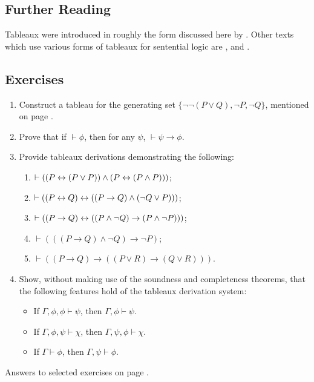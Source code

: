 {\small

\subsection*{Further Reading}

Tableaux were introduced in roughly the form discussed here by \citet{smullyan}. Other texts which use various forms of tableaux for sentential logic are \citealt[ch. 4]{bevpospa}, \citealt{priintncl} and \citealt{smith}.

\subsection*{Exercises} \label{ex6}

\begin{enumerate}
\item Construct a tableau for the generating set $\{¬¬(P\vee Q),¬P,¬Q\}$, mentioned on page \pageref{tabl6ex}.
 \item Prove that if $\vdash \phi$, then for any $\psi$, $\vdash \psi\to\phi$.

	\item Provide  tableaux derivations demonstrating the following: \begin{enumerate}
		\item $\vdash ((P \leftrightarrow (P \vee P)) \wedge (P \leftrightarrow (P \wedge P)))$;
		\item $\vdash ((P\leftrightarrow Q) \leftrightarrow ((P\to Q) \wedge (\neg Q \vee P)))$;
		\item $\vdash ((P \to Q) \leftrightarrow ((P \wedge \neg Q) \to (P \wedge \neg P)))$;
		\item $\vdash (((P \to Q) \wedge \neg Q) \to \neg P)$;
		\item $\vdash ((P \to Q) \to ((P \vee R) \to (Q \vee R)))$.
	\end{enumerate}
	\item Show, without making use of the soundness and completeness theorems, that the following features hold of the tableaux derivation system: 
	\begin{itemize}
	\item If $\Gamma, \phi, \phi \vdash
	\psi$, then $\Gamma, \phi \vdash
	\psi$.
	
	\item If $\Gamma, \phi, \psi \vdash
	\chi$, then $\Gamma, \psi, \phi \vdash
	\chi$.
	
	\item If $\Gamma \vdash \phi$, then  $\Gamma, \psi \vdash \phi$.
	
\end{itemize}

 \end{enumerate}


Answers to selected exercises on page \pageref{ans6}.
}
